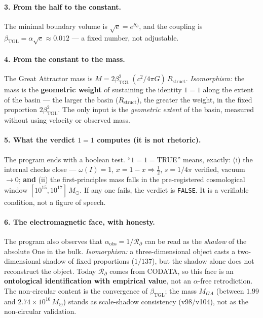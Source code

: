 \documentclass[11pt]{article}
\newcommand{\bTGL}{\beta_{\mathrm{TGL}}}\newcommand{\Msun}{M_{\odot}}\newcommand{\TGL}{\mathrm{TGL}}
\theoremstyle{definition}\newtheorem{deriv}{Derivation}
\begin{document}
\paragraph{3. From the half to the constant.} The minimal boundary volume is $\sqrt e=e^{S_\partial}$, and the coupling is $\bTGL=\alpha\sqrt e\approx0.012$ --- a fixed number, not adjustable.

\paragraph{4. From the constant to the mass.} The Great Attractor mass is $M=2\bTGL^2\,(c^2/4\pi G)\,R_{\mathrm{struct}}$. \emph{Isomorphism:} the mass is the \textbf{geometric weight} of sustaining the identity $1=1$ along the extent of the basin --- the larger the basin ($R_{\mathrm{struct}}$), the greater the weight, in the fixed proportion $2\bTGL^2$. The only input is the \emph{geometric extent} of the basin, measured without using velocity or observed mass.

\paragraph{5. What the verdict $1=1$ computes (it is not rhetoric).} The program ends with a boolean test. ``$1=1=$TRUE'' means, exactly: (i) the internal checks close --- $\omega(I)=1$, $x=1-x\Rightarrow\tfrac12$, $s=1/4\pi$ verified, vacuum $\to0$; \textbf{and} (ii) the first-principles mass falls in the pre-registered cosmological window $[10^{15},10^{17}]\,\Msun$. If any one fails, the verdict is \texttt{FALSE}. It is a verifiable condition, not a figure of speech.

\paragraph{6. The electromagnetic face, with honesty.} The program also observes that $\alpha_{\mathrm{obs}}=1/\mathcal{R}_\partial$ can be read as the \emph{shadow} of the absolute One in the bulk. \emph{Isomorphism:} a three-dimensional object casts a two-dimensional shadow of fixed proportions ($1/137$), but the shadow alone does not reconstruct the object. Today $\mathcal{R}_\partial$ comes from CODATA, so this face is an \textbf{ontological identification with empirical value}, not an $\alpha$-free retrodiction. The non-circular content is the convergence of $\bTGL$; the mass $M_{GA}$ (between $1.99$ and $2.74\times10^{16}\,\Msun$) stands as scale-shadow consistency (v98/v104), not as the non-circular validation.
\end{document}
